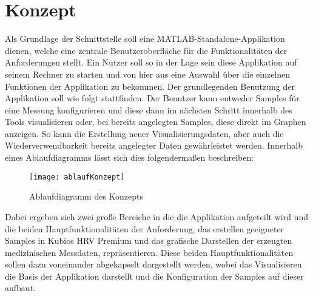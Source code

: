
\chapter{Konzept}

Als Grundlage der Schnittstelle soll eine MATLAB-Standalone-Applikation dienen, welche eine zentrale Benutzeroberfläche für die Funktionalitäten der Anforderungen stellt. Ein Nutzer soll so in der Lage sein diese Applikation auf seinem Rechner zu starten und von hier aus eine Auswahl über die einzelnen Funktionen der Applikation zu bekommen. Der grundlegenden Benutzung der Applikation soll wie folgt stattfinden. Der Benutzer kann entweder Samples für eine Messung konfigurieren und diese dann im nächsten Schritt innerhalb des Tools visualisieren oder, bei bereits angelegten Samples, diese direkt im Graphen anzeigen. So kann die Erstellung neuer Visualisierungsdaten, aber auch die Wiederverwendbarkeit bereits angelegter Daten gewährleistet werden. Innerhalb eines Ablaufdiagramms lässt sich dies folgendermaßen beschreiben:

\begin{figure}[!htbp]
	\centering
	\texttt{[image: ablaufKonzept]}
	\caption{Ablaufdiagramm des Konzepts}
	\label{fig:ablaufKonzept}
\end{figure}

Dabei ergeben sich zwei große Bereiche in die die Applikation aufgeteilt wird und die beiden Hauptfunktionalitäten der Anforderung, das erstellen geeigneter Samples in Kubios HRV Premium und das grafische Darstellen der erzeugten medizinischen Messdaten, repräsentieren. Diese beiden Hauptfunktionalitäten sollen dazu voneinander abgekapselt dargestellt werden, wobei das Visualisieren die Basis der Applikation darstellt und die Konfiguration der Samples auf dieser aufbaut.


